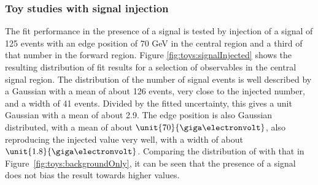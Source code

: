 \subsubsection{Toy studies with signal injection}
\label{sec:toysW}
The fit performance in the presence of a signal is tested by injection of a signal of 125 events with an edge position of 70 GeV in the central region and a third of that number in the forward region. Figure \ref{fig:toys:signalInjected} shows the resulting distribution of fit results for a selection of observables in the central signal region. The distribution of the number of signal events is well described by a Gaussian with a mean of about 126 events, very close to the injected number, and a width of 41 events. Divided by the fitted uncertainty, this gives a unit Gaussian with a mean of about 2.9. The edge position is also Gaussian distributed, with a mean of about $\unit{70}{\giga\electronvolt}$, also reproducing the injected value very well, with a width of about $\unit{1.8}{\giga\electronvolt}$. Comparing the distribution of \Rsfof with that in Figure~\ref{fig:toys:backgroundOnly}, it can be seen that the presence of a signal does not bias the result towards higher values. 

